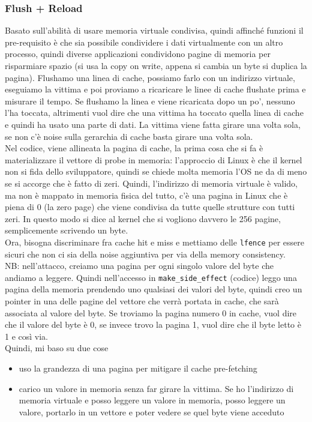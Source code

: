 \documentclass[12pt, oneside]{extbook} %
\begin{document}
\subsubsection{Flush + Reload}
Basato sull'abilità di usare memoria virtuale condivisa, quindi affinché funzioni il pre-requisito è che sia possibile condividere i dati virtualmente con un altro processo, quindi diverse applicazioni condividono pagine di memoria per risparmiare spazio (si usa la copy on write, appena si cambia un byte si duplica la pagina). Flushamo una linea di cache, possiamo farlo con un indirizzo virtuale, eseguiamo la vittima e poi proviamo a ricaricare le linee di cache flushate prima e misurare il tempo. Se flushamo la linea e viene ricaricata dopo un po', nessuno l'ha toccata, altrimenti vuol dire che una vittima ha toccato quella linea di cache e quindi ha usato una parte di dati. La vittima viene fatta girare una volta sola, se non c'è noise sulla gerarchia di cache basta girare una volta sola.\\ Nel codice, viene allineata la pagina di cache, la prima cosa che si fa è materializzare il vettore di probe in memoria: l'approccio di Linux è che il kernel non si fida dello sviluppatore, quindi se chiede molta memoria l'OS ne da di meno se si accorge che è fatto di zeri. Quindi, l'indirizzo di memoria virtuale è valido, ma non è mappato in memoria fisica del tutto, c'è una pagina in Linux che è piena di 0 (la zero page) che viene condivisa da tutte quelle strutture con tutti zeri. In questo modo si dice al kernel che si vogliono davvero le 256 pagine, semplicemente scrivendo un byte.\\ Ora, bisogna discriminare fra cache hit e miss e mettiamo delle \texttt{lfence} per essere sicuri che non ci sia della noise aggiuntiva per via della memory consistency.\\ NB: nell'attacco, creiamo una pagina per ogni singolo valore del byte che andiamo a leggere. Quindi nell'accesso in \texttt{make\_side\_effect} (codice) leggo una pagina della memoria prendendo uno qualsiasi dei valori del byte, quindi creo un pointer in una delle pagine del vettore che verrà portata in cache, che sarà associata al valore del byte. Se troviamo la pagina numero 0 in cache, vuol dire che il valore del byte è 0, se invece trovo la pagina 1, vuol dire che il byte letto è 1 e così via.\\ Quindi, mi baso su due cose
\begin{itemize}
\item uso la grandezza di una pagina per mitigare il cache pre-fetching
\item carico un valore in memoria senza far girare la vittima. Se ho l'indirizzo di memoria virtuale e posso leggere un valore in memoria, posso leggere un valore, portarlo in un vettore e poter vedere se quel byte viene acceduto
\end{itemize}
\end{document}

